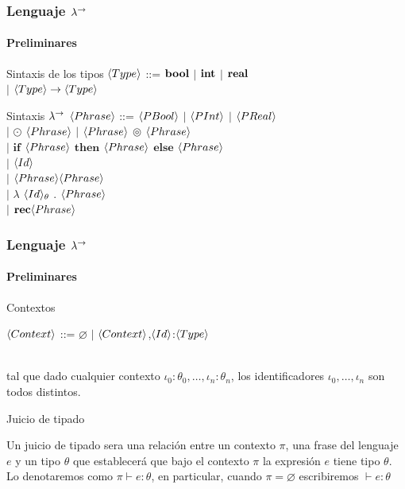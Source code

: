 \documentclass{beamer}
\begin{document}
\begin{frame}
\frametitle{Lenguaje $\lambda^{\rightarrow}$}
\framesubtitle{Preliminares}

\begin{block}{Sintaxis de los tipos}
$\langle Type \rangle$ ::= $\textbf{bool}$ $|$ $\textbf{int}$ $|$ $\textbf{real}$\\
\quad \quad \quad \quad
$|$ $\langle Type \rangle \rightarrow \langle Type \rangle$\\
\end{block}

\begin{block}{Sintaxis $\lambda^{\rightarrow}$}
$\langle Phrase \rangle$ ::= $\langle PBool \rangle$ $|$ $\langle PInt \rangle$ $|$ $\langle PReal \rangle$\\
\quad \quad \quad \quad \quad
$|$ $\odot$ $\langle Phrase \rangle$ $|$ $\langle Phrase \rangle$ $\circledcirc$ $\langle Phrase \rangle$\\
\quad \quad \quad \quad \quad
$|$ $\textbf{if}$ $\langle Phrase \rangle$ $\textbf{then}$ $\langle Phrase \rangle$ $\textbf{else}$ $\langle Phrase \rangle$\\
\quad \quad \quad \quad \quad
$|$ $\langle Id \rangle$\\
\quad \quad \quad \quad  \quad
$|$ $\langle Phrase \rangle\langle Phrase \rangle$\\
\quad \quad \quad \quad  \quad
$|$ $\lambda$ $\langle Id \rangle_\theta$ . $\langle Phrase \rangle$\\
\quad \quad \quad \quad  \quad
$|$ $\textbf{rec} \langle Phrase \rangle$\\
\end{block}

\end{frame}

\begin{frame}
\frametitle{Lenguaje $\lambda^{\rightarrow}$}
\framesubtitle{Preliminares}

\begin{block}{Contextos}

$\langle Context \rangle$ ::= $\varnothing$ $|$ $\langle Context \rangle$,$\langle Id \rangle$:$\langle Type \rangle$\\

\

\noindent
tal que dado cualquier contexto $\iota_0:\theta_0,\ldots,\iota_n:\theta_n$, los
identificadores $\iota_0,\ldots,\iota_n$ son todos distintos.
\end{block}

\begin{block}{Juicio de tipado}

Un juicio de tipado sera una relaci\'on entre un contexto $\pi$, una
frase del lenguaje $e$ y un tipo $\theta$ que establecer\'a que
bajo el contexto $\pi$ la expresi\'on $e$ tiene tipo $\theta$.
Lo denotaremos como  $\pi \vdash e : \theta$, 
en particular, cuando $\pi = \varnothing$ escribiremos
$\vdash e : \theta$

\end{block}

\end{frame}
\end{document}
